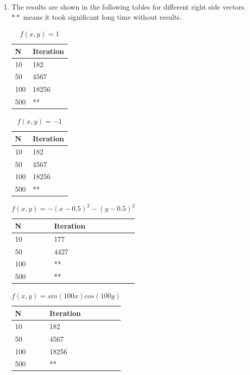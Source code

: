 \documentclass{article}
\begin{document}
\begin{enumerate}
\item 
The results are shown in the following tables for different right side vectors. $**$ means it took significant long time without results. \\
\begin{table}[!htbp]
\centering
\caption{$f(x, y)=1$ }
\label{my-label}
\begin{tabular}{|l|l|}
\hline
N   & Iteration \\ \hline
10  &  182      \\ \hline
50  &   4567        \\ \hline
100 &    18256       \\ \hline
500 &    **       \\ \hline
\end{tabular}
\end{table}

\begin{table}[!htbp]
\centering
\caption{$f(x, y)=-1$ }
\label{my-label}
\begin{tabular}{|l|l|}
\hline
N   & Iteration \\ \hline
10  & 182       \\ \hline
50  &   4567        \\ \hline
100 &    18256       \\ \hline
500 &    **       \\ \hline
\end{tabular}
\end{table}

\begin{table}[!htbp]
\centering
\caption{$f(x, y)=-(x-0.5)^2-(y-0.5)^2$ }
\label{my-label}
\begin{tabular}{|l|l|}
\hline
N   & Iteration \\ \hline
10  &  177      \\ \hline
50  &    4427       \\ \hline
100 &    **       \\ \hline
500 &    **      \\ \hline
\end{tabular}
\end{table}

\begin{table}[!htbp]
\centering
\caption{$f(x, y)=sin(100x)cos(100y)$ }
\label{my-label}
\begin{tabular}{|l|l|}
\hline
N   & Iteration \\ \hline
10  & 182       \\ \hline
50  &  4567         \\ \hline
100 &   18256        \\ \hline
500 &    **       \\ \hline
\end{tabular}
\end{table}
\end{enumerate}
\end{document}
